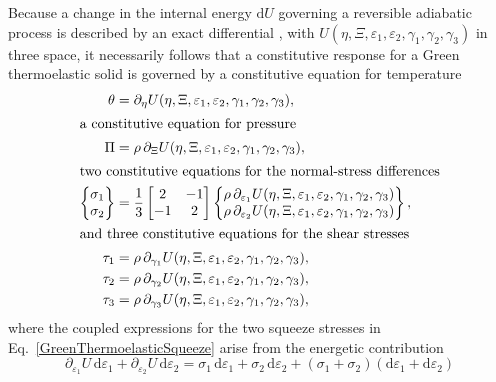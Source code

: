 Because a change in the internal energy $\mathrm{d} U$ governing a reversible adiabatic process is described by an exact differential \cite{Caratheodory09}, with $U( \eta, \Xi, \varepsilon_1 , \varepsilon_2 , \gamma_1 , \gamma_2 , \gamma_3 )$ in three space, it necessarily follows that a constitutive response for a Green thermo\-elastic solid is governed by a constitutive equation for temperature \cite{Freed17}
\begin{subequations}
    \label{GreenThermoelasticSolid}
\begin{align}
\theta & = \partial_{\eta} U( \eta, \Xi, \varepsilon_1 , \varepsilon_2 , \gamma_1 , \gamma_2 , \gamma_3 ), \\
\intertext{a constitutive equation for pressure}
\Pi & = \rho \, \partial_{\Xi} U( \eta, \Xi, \varepsilon_1 , \varepsilon_2 , \gamma_1 , \gamma_2 , \gamma_3 ),  \\
\intertext{two constitutive equations for the normal-stress differences}
\left\{ \begin{matrix}
\sigma_1 \\ \sigma_2
\end{matrix} \right\} & = \frac{1}{3} \begin{bmatrix}
2 & -1 \\ -1 & 2
\end{bmatrix} \left\{ \begin{matrix}
\rho \, \partial_{\varepsilon_1} U( \eta, \Xi, \varepsilon_1 , \varepsilon_2 , \gamma_1 , \gamma_2 , \gamma_3 ) \\
\rho \, \partial_{\varepsilon_2} U( \eta, \Xi, \varepsilon_1 , \varepsilon_2 , \gamma_1 , \gamma_2 , \gamma_3 )
\end{matrix} \right\} ,\label{GreenThermoelasticSqueeze} \\
\intertext{and three constitutive equations for the shear stresses}
\tau_1 & = \rho \, \partial_{\gamma_1} U( \eta, \Xi, \varepsilon_1 , \varepsilon_2 , \gamma_1 , \gamma_2 , \gamma_3 ), \\
\tau_2 & = \rho \, \partial_{\gamma_2} U( \eta, \Xi, \varepsilon_1 , \varepsilon_2 , \gamma_1 , \gamma_2 , \gamma_3 ) ,\\
\tau_3 & = \rho \, \partial_{\gamma_3} U( \eta, \Xi, \varepsilon_1 , \varepsilon_2 , \gamma_1 , \gamma_2 , \gamma_3 ) ,
\end{align}
\end{subequations}
where the coupled expressions for the two squeeze stresses in Eq.~\ref{GreenThermoelasticSqueeze} arise from the energetic contribution
\begin{displaymath}
    \partial_{\varepsilon_1} U \, \mathrm{d} \varepsilon_1 +
    \partial_{\varepsilon_2} U \, \mathrm{d} \varepsilon_2 = 
    \sigma_1 \, \mathrm{d} \varepsilon_1 +
    \sigma_2 \, \mathrm{d} \varepsilon_2 + 
    (\sigma_1 + \sigma_2) (\mathrm{d} \varepsilon_1 + \mathrm{d} \varepsilon_2)
\end{displaymath}
